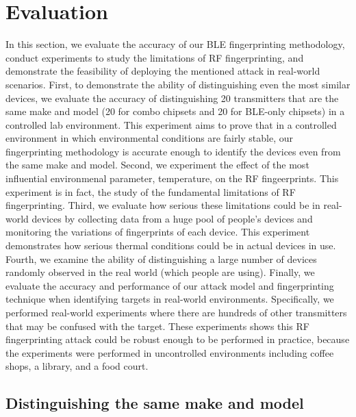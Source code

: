 \section{Evaluation}
\label{sec:results}

In this section, we evaluate the accuracy of our BLE fingerprinting
methodology, conduct experiments to study the limitations of RF fingerprinting, and demonstrate the feasibility of deploying the mentioned attack in real-world scenarios. First, to demonstrate the ability of distinguishing even the most similar devices, we evaluate the accuracy of distinguishing 20 transmitters
that are the same make and model (20 for combo chipsets and 20 for BLE-only chipsets) in a
controlled lab environment. This experiment aims to prove that in a controlled environment in which environmental conditions are fairly stable, our fingerprinting methodology is accurate enough to identify the devices even from the same make and model. Second, we experiment the effect of the most influential environmenal parameter, temperature, on the RF fingeerprints. This experiment is in fact, the study of the fundamental limitations of RF fingerprinting. Third, we evaluate how serious these limitations could be in real-world devices by collecting data from a huge pool of people's devices and monitoring the variations of fingerprints of each device. This experiment demonstrates how serious thermal conditions could be in actual devices in use. Fourth, we examine the ability of distinguishing a large number of devices randomly observed in the real world (which people are using). Finally, we evaluate the accuracy and performance of
our attack model and fingerprinting technique when identifying targets in real-world environments.
Specifically, we performed real-world experiments where there are hundreds of
other transmitters that may be confused with the target. These experiments shows this
RF fingerprinting attack could be robust enough to be performed in practice, because
the experiments were performed in uncontrolled environments including coffee
shops, a library, and a food court.



\subsection{Distinguishing the same make and model}

